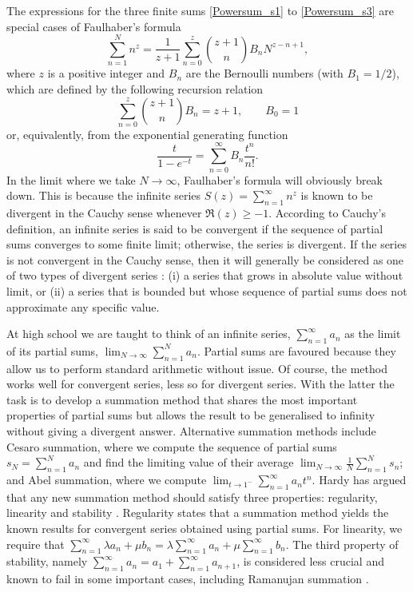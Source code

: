 \documentclass[12pt, letter]{article}
\def\be{\begin{equation}}
\def\ee{\end{equation}}
\begin{document}
The expressions for the three finite sums  \eqref{Powersum_s1} to \eqref{Powersum_s3} are special cases of Faulhaber's formula \cite{Knuth_1993}
\begin{equation} \label{Faul}
\sum_{n=1}^N n^z=\frac{1}{z+1} \sum_{n=0}^z \binom{z+1}{n}  B_n N^{z-n+1},
\end{equation}
where $z$ is a positive integer and $B_n$ are the Bernoulli numbers (with $B_1= 1/2$), which are defined  by the following recursion relation
\be \label{recursion}
\sum_{n=0}^{z} \binom{z+1}{ n} B_{n}=z+1, \qquad B_0=1
\ee
or, equivalently, from  the exponential generating function
\be
\frac{t}{1-e^{-t}}=\sum_{n=0}^\infty B_n \frac{t^n}{n!}.
\ee
In the limit where we take $N \to \infty$, Faulhaber's formula will obviously break down.  This is because the infinite series $S(z)=\sum_{n=1}^\infty n^z$ is known to be divergent in the Cauchy sense  whenever $\Re(z) \geq -1$. According to Cauchy's definition,  an infinite series is said to be convergent if the sequence of partial sums converges to some finite limit; otherwise, the series is divergent. If the series is not convergent in the Cauchy sense, then it will generally be considered as one of two types of divergent series \citep{Hardy73,Graham91ConcreteMaths}: (i) a series that grows in absolute value without limit,  or (ii) a series that is bounded but whose sequence of partial sums does not approximate any specific value. 

At high school we are taught to think of an infinite series, $\sum_{n=1}^\infty a_n$ as the limit of its partial sums, $\lim_{N\to\infty} \sum_{n=1}^N a_n$.  Partial sums are favoured because  they allow us to  perform  standard arithmetic without issue. Of course, the method works well for convergent series, less so for divergent series.  With the latter the task is to develop a summation method that shares the most important properties of partial sums but allows the result to be generalised to infinity without giving a divergent answer.  Alternative summation methods include Cesaro summation, where we compute the sequence of partial sums $s_N=\sum_{n=1}^N a_n$ and find the limiting value of their average $\lim_{N \to \infty} \frac{1}{N}\sum_{n=1}^N s_n$; and Abel summation, where we compute $\lim_{t \to 1^-} \sum_{n=1}^\infty a_n t^n$. Hardy has argued that any new summation method should satisfy three properties: regularity, linearity and stability \citep{Hardy73}. Regularity states that a summation method yields the known results for convergent series obtained using partial sums. For linearity, we  require that $\sum_{n = 1 }^\infty {\lambda a_n+\mu b_n=}\lambda \sum_{n = 1 }^\infty a_n+\mu \sum_{n = 1 }^\infty b_n$.  The third property of stability, namely  $\sum_{n = 1 }^\infty a_n =a_1+\sum_{n = 1 }^\infty a_{n+1}$,  is considered less crucial and known to fail in some important cases, including Ramanujan summation \citep{Candelpergher17}.  
\end{document}
